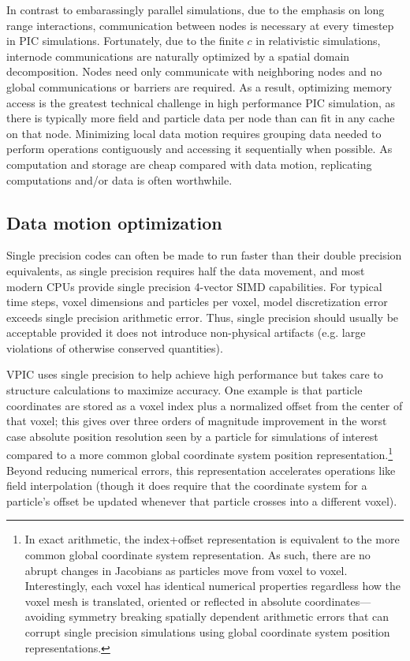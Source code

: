 \documentclass[journal,twoside]{IEEEtran}
\begin{document}
In contrast to embarassingly parallel simulations, due to the
emphasis on long range interactions, communication between nodes is
necessary at every timestep in PIC simulations.  Fortunately, due to the
finite $c$ in relativistic simulations, internode communications are
naturally optimized by a spatial domain decomposition.  Nodes need
only communicate with neighboring nodes and no global communications
or barriers are required.  As a result, optimizing memory access is
the greatest technical challenge in high performance PIC simulation, as
there is typically more field and particle data per node than can fit
in any cache on that node.  Minimizing local data motion requires
grouping data needed to perform operations contiguously and accessing
it sequentially when possible.  As computation and storage are cheap
compared with data motion, replicating computations and/or data is
often worthwhile.

\subsection{Data motion optimization}

Single precision codes can often be made to run faster than their
double precision equivalents, as single precision requires half the
data movement, and most modern CPUs provide single precision 4-vector
SIMD capabilities.  For typical time steps, voxel dimensions and
particles per voxel, model discretization error exceeds single
precision arithmetic error.  Thus, single precision should usually be
acceptable provided it does not introduce non-physical artifacts
(e.g. large violations of otherwise conserved quantities).

VPIC uses single precision to help achieve high performance but takes
care to structure calculations to maximize accuracy.  One example is
that particle coordinates are stored as a voxel index plus a
normalized offset from the center of that voxel; this gives over three
orders of magnitude improvement in the worst case absolute position
resolution seen by a particle for simulations of interest compared to
a more common global coordinate system position
representation.\footnote{In exact arithmetic, the index+offset
representation is equivalent to the more common global coordinate
system representation.  As such, there are no abrupt changes in
Jacobians as particles move from voxel to voxel.  Interestingly, each
voxel has identical numerical properties regardless how the voxel mesh
is translated, oriented or reflected in absolute
coordinates---avoiding symmetry breaking spatially dependent
arithmetic errors that can corrupt single precision simulations using
global coordinate system position representations.}  Beyond reducing
numerical errors, this representation accelerates operations like
field interpolation (though it does require that the coordinate system
for a particle's offset be updated whenever that particle crosses into
a different voxel).
\end{document}
